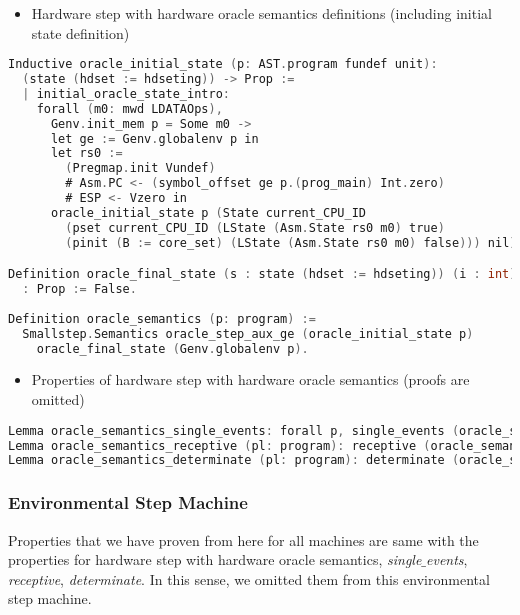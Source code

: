 \begin{itemize}[leftmargin=*]
\item Hardware step with hardware oracle semantics definitions (including initial state definition)
\end{itemize}
\begin{lstlisting}[language=C]
Inductive oracle_initial_state (p: AST.program fundef unit): 
  (state (hdset := hdseting)) -> Prop := 
  | initial_oracle_state_intro: 
    forall (m0: mwd LDATAOps),
      Genv.init_mem p = Some m0 ->
      let ge := Genv.globalenv p in
      let rs0 :=
        (Pregmap.init Vundef)
        # Asm.PC <- (symbol_offset ge p.(prog_main) Int.zero)
        # ESP <- Vzero in
      oracle_initial_state p (State current_CPU_ID 
        (pset current_CPU_ID (LState (Asm.State rs0 m0) true)
        (pinit (B := core_set) (LState (Asm.State rs0 m0) false))) nil).

Definition oracle_final_state (s : state (hdset := hdseting)) (i : int)
  : Prop := False.
      
Definition oracle_semantics (p: program) :=
  Smallstep.Semantics oracle_step_aux_ge (oracle_initial_state p) 
    oracle_final_state (Genv.globalenv p). 
\end{lstlisting}

\begin{itemize}[leftmargin=*]
\item Properties of hardware step with hardware oracle semantics (proofs are omitted)
\end{itemize}
\begin{lstlisting}[language=C]
Lemma oracle_semantics_single_events: forall p, single_events (oracle_semantics p).
Lemma oracle_semantics_receptive (pl: program): receptive (oracle_semantics pl).
Lemma oracle_semantics_determinate (pl: program): determinate (oracle_semantics pl).
\end{lstlisting}

\subsubsection{Environmental Step Machine}

Properties that we have proven from here for all machines are same with the properties for  hardware step with hardware oracle semantics,
\textit{single$\_$events}, \textit{receptive}, \textit{determinate}. 
In this sense, we omitted them from this environmental step machine.

